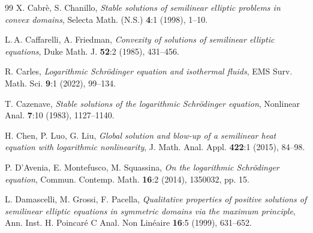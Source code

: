 \documentclass[12pt]{amsart}
\numberwithin{equation}{section}
\theoremstyle{plain}
\theoremstyle{plain}
\theoremstyle{plain}
\theoremstyle{definition}
\begin{document}
\begin{thebibliography}{99}
X. Cabrè, S. Chanillo,
\emph{Stable solutions of semilinear elliptic problems in convex domains},
Selecta Math. (N.S.) \textbf{4}:1 (1998), 1--10.

L.$\,$A. Caffarelli, A. Friedman,
\emph{Convexity of solutions of semilinear elliptic equations},
Duke Math. J. \textbf{52}:2 (1985), 431--456.

R. Carles,
\emph{Logarithmic Schrödinger equation and isothermal fluids},
EMS Surv. Math. Sci. \textbf{9}:1 (2022), 99--134.

T. Cazenave, 
\emph{Stable solutions of the logarithmic Schrödinger equation},
 Nonlinear Anal. {\bf 7}:10 (1983), 1127--1140.







H. Chen, P. Luo, G. Liu,
\emph{Global solution and blow-up of a semilinear heat equation with logarithmic nonlinearity},
J. Math. Anal. Appl. \textbf{422}:1 (2015), 84--98.

P. D'Avenia, E. Montefusco, M. Squassina,
\emph{On the logarithmic Schrödinger equation},
Commun. Contemp. Math. \textbf{16}:2 (2014), 1350032, pp. 15.

L. Damascelli, M. Grossi, F. Pacella,
\emph{Qualitative properties of positive solutions of semilinear elliptic equations in symmetric domains via the maximum principle},
Ann. Inst. H. Poincaré C Anal. Non Linéaire \textbf{16}:5 (1999), 631--652.


\end{thebibliography}
\end{document}
